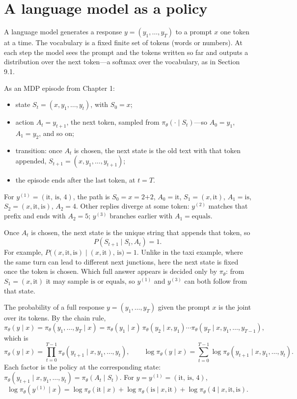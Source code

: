 \section{A language model as a policy}

A language model generates a response $y=(y_1,\ldots,y_T)$ to a prompt $x$ one token at a time. The vocabulary is a fixed finite set of tokens (words or numbers). At each step the model sees the prompt and the tokens written so far and outputs a distribution over the next token---a softmax over the vocabulary, as in Section 9.1.

As an MDP episode from Chapter 1:

\begin{itemize}
\item state $S_t=(x,y_1,\ldots,y_t)$, with $S_0=x$;
\item action $A_t=y_{t+1}$, the next token, sampled from $\pi_\theta(\cdot\mid S_t)$---so $A_0=y_1$, $A_1=y_2$, and so on;
\item transition: once $A_t$ is chosen, the next state is the old text with that token appended, $S_{t+1}=(x,y_1,\ldots,y_{t+1})$;
\item the episode ends after the last token, at $t=T$.
\end{itemize}
For $y^{(1)}=(\text{it},\,\text{is},\,4)$, the path is $S_0=x=\text{2+2}$, $A_0=\text{it}$, $S_1=(x,\text{it})$, $A_1=\text{is}$, $S_2=(x,\text{it},\text{is})$, $A_2=4$. Other replies diverge at some token: $y^{(2)}$ matches that prefix and ends with $A_2=5$; $y^{(3)}$ branches earlier with $A_1=\text{equals}$.

Once $A_t$ is chosen, the next state is the unique string that appends that token, so \[
P(S_{t+1}\mid S_t,A_t)=1.
\] For example, $P\bigl((x,\text{it},\text{is})\mid (x,\text{it}),\,\text{is}\bigr)=1$. Unlike in the taxi example, where the same turn can lead to different next junctions, here the next state is fixed once the token is chosen. Which full answer appears is decided only by $\pi_\theta$: from $S_1=(x,\text{it})$ it may sample $\text{is}$ or $\text{equals}$, so $y^{(1)}$ and $y^{(3)}$ can both follow from that state.

The probability of a full response $y=(y_1,\ldots,y_T)$ given the prompt $x$ is the joint over its tokens. By the chain rule, \[
\pi_\theta(y\mid x)
=
\pi_\theta(y_1,\ldots,y_T\mid x)
=
\pi_\theta(y_1\mid x)\,
\pi_\theta(y_2\mid x,y_1)
\cdots
\pi_\theta(y_T\mid x,y_1,\ldots,y_{T-1}),
\] which is \begin{equation}
\pi_\theta(y\mid x)
=
\prod_{t=0}^{T-1}
\pi_\theta(y_{t+1}\mid x,y_1,\ldots,y_t),
\qquad
\log\pi_\theta(y\mid x)
=
\sum_{t=0}^{T-1}
\log\pi_\theta(y_{t+1}\mid x,y_1,\ldots,y_t).
\tag{11.1}
\end{equation} Each factor is the policy at the corresponding state: $\pi_\theta(y_{t+1}\mid x,y_1,\ldots,y_t)=\pi_\theta(A_t\mid S_t)$. For $y=y^{(1)}=(\text{it},\,\text{is},\,4)$, \[
\log\pi_\theta(y^{(1)}\mid x)
=
\log\pi_\theta(\text{it}\mid x)
+
\log\pi_\theta(\text{is}\mid x,\text{it})
+
\log\pi_\theta(4\mid x,\text{it},\text{is}).
\]

